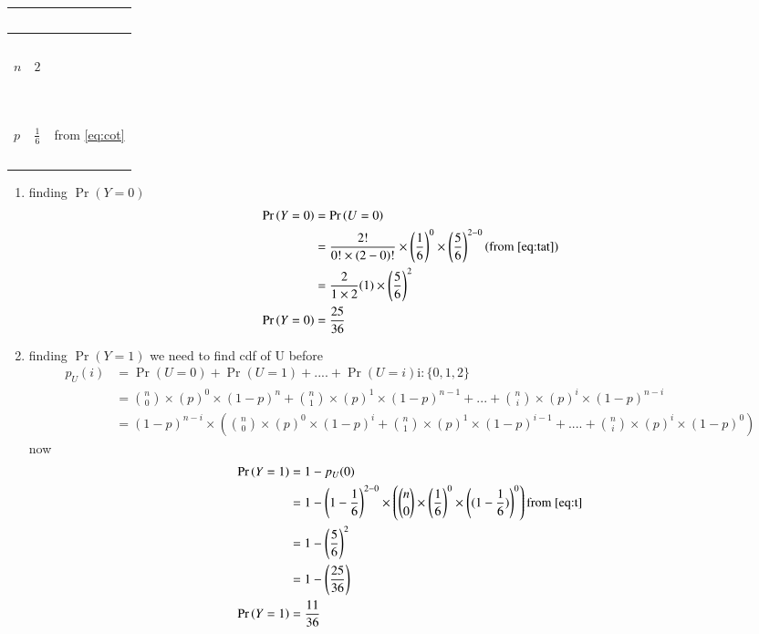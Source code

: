 \documentclass[journal,12pt,onecolumn]{IEEEtran}
\providecommand{\pr}[1]{\ensuremath{\Pr\left(#1\right)}}
\providecommand{\brak}[1]{\ensuremath{\left(#1\right)}}
\theoremstyle{remark}
\begin{document}
\begin{enumerate}
\begin{tabular}{|l|l|l|}
\ & \ & \  \\
\hline
\ &\ &\  \\
\large {$n$} & \large{$2$} &  \\
\ & \ & \  \\
\hline
\ & \ & \  \\
\large {$p$} & \large$\frac{1}{6}$& from \eqref{eq:cot}\\
\ & \ & \  \\
\hline
\end{tabular}
\begin{enumerate}
\item finding $\pr{Y=0}$
\begin{align}
\pr{Y=0}&=\pr{U=0}\\
&=\frac{2!}{0!\times(2-0)!}\times\brak{\frac{1}{6}}^0\times\brak{\frac{5}{6}}^{2-0} (\text{from } \eqref{eq:tat})\\
&=\frac{2}{1\times2}(1)\times\brak{\frac{5}{6}}^{2}\\
\pr{Y=0}&=\frac{25}{36}
\end{align}
\item finding $\pr{Y=1}$
we need to find cdf of U before
\begin{align}
p_U(i)&=\pr{U=0}+\pr{U=1}+....+\pr{U=i} \text{i}:\{ 0,1,2\}\\
&={n \choose 0 }\times(p)^0\times(1-p)^{n}+{n \choose 1}\times(p)^1\times(1-p)^{n-1}+...+{n \choose i}\times(p)^i\times(1-p)^{n-i}\\
&=(1-p)^{n-i}\times({n \choose 0 }\times(p)^0\times(1-p)^{i}+{n \choose 1 }\times(p)^1\times(1-p)^{i-1}+....+{n \choose i }\times(p)^i\times(1-p)^{0})\label{eq:t}
\end{align} 
now
\begin{align}
\pr{Y=1}&=1-p_U(0)\\
&= 1-\brak{1-\frac{1}{6}}^{2-0}\times\brak{{n \choose 0 }\times\brak{\frac{1}{6}}^0\times\brak{(1-\frac{1}{6})}^{0}} \text{from } \eqref{eq:t} \\
&=1-\brak{\frac{5}{6}}^{2}\\
&=1-\brak{\frac{25}{36}} \\
\pr{Y=1}&=\frac{11}{36}
\end{align}
\end{enumerate}

\end{enumerate}
\end{document}
